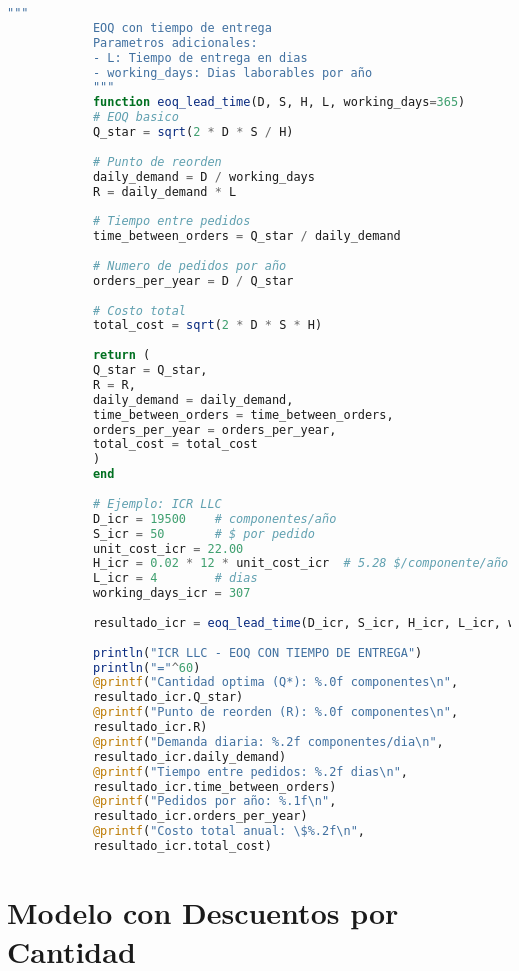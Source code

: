 \documentclass[12pt,a4paper]{book}
\begin{document}
	\begin{tcolorbox}[enhanced,colback=naranjaclaro,colframe=naranjaacento,boxrule=3pt,arc=12pt,
		drop shadow,title={\Large\bfseries\color{white} \faHourglass\ MODELO CON LEAD TIME},breakable]
		
		\begin{lstlisting}[language=Julia,basicstyle=\footnotesize\ttfamily]
			"""
			EOQ con tiempo de entrega
			Parametros adicionales:
			- L: Tiempo de entrega en dias
			- working_days: Dias laborables por año
			"""
			function eoq_lead_time(D, S, H, L, working_days=365)
			# EOQ basico
			Q_star = sqrt(2 * D * S / H)
			
			# Punto de reorden
			daily_demand = D / working_days
			R = daily_demand * L
			
			# Tiempo entre pedidos
			time_between_orders = Q_star / daily_demand
			
			# Numero de pedidos por año
			orders_per_year = D / Q_star
			
			# Costo total
			total_cost = sqrt(2 * D * S * H)
			
			return (
			Q_star = Q_star,
			R = R,
			daily_demand = daily_demand,
			time_between_orders = time_between_orders,
			orders_per_year = orders_per_year,
			total_cost = total_cost
			)
			end
			
			# Ejemplo: ICR LLC
			D_icr = 19500    # componentes/año
			S_icr = 50       # $ por pedido
			unit_cost_icr = 22.00
			H_icr = 0.02 * 12 * unit_cost_icr  # 5.28 $/componente/año
			L_icr = 4        # dias
			working_days_icr = 307
			
			resultado_icr = eoq_lead_time(D_icr, S_icr, H_icr, L_icr, working_days_icr)
			
			println("ICR LLC - EOQ CON TIEMPO DE ENTREGA")
			println("="^60)
			@printf("Cantidad optima (Q*): %.0f componentes\n", 
			resultado_icr.Q_star)
			@printf("Punto de reorden (R): %.0f componentes\n", 
			resultado_icr.R)
			@printf("Demanda diaria: %.2f componentes/dia\n", 
			resultado_icr.daily_demand)
			@printf("Tiempo entre pedidos: %.2f dias\n", 
			resultado_icr.time_between_orders)
			@printf("Pedidos por año: %.1f\n", 
			resultado_icr.orders_per_year)
			@printf("Costo total anual: \$%.2f\n", 
			resultado_icr.total_cost)
		\end{lstlisting}
		
	\end{tcolorbox}
	
	\section{Modelo con Descuentos por Cantidad}
	
\end{document}
